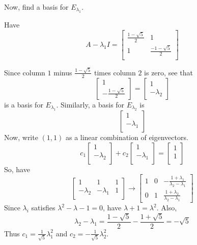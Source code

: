 \documentclass{article}
\begin{document}
\begin{example}
      Now, find a basis for $E_{\lambda_1}$.

      Have \[
        A - \lambda_1 I =
        \begin{bmatrix}
          \frac{1 - \sqrt{5}}{2} & 1\\
          1 & \frac{-1 - \sqrt{5}}{2}\\
        \end{bmatrix}
      \]

      Since column $1$ minus $\frac{1 - \sqrt{5}}{2}$ times column $2$ is zero, see that \[
        \begin{bmatrix}
          1\\
          -\frac{1 - \sqrt{5}}{2}
        \end{bmatrix} =
        \begin{bmatrix}
          1\\
          -\lambda_2
        \end{bmatrix}
      \] is a basis for $E_{\lambda_1}$. Similarly, a basis for $E_{\lambda_2}$ is \[
        \begin{bmatrix}
          1\\
          -\lambda_1\\
        \end{bmatrix}
      \]
      Now, write $(1, 1)$ as a linear combination of eigenvectors.
      \[
        c_1
        \begin{bmatrix}
          1\\-\lambda_2\\
        \end{bmatrix} + c_2
        \begin{bmatrix}
          1\\-\lambda_1\\
        \end{bmatrix} =
        \begin{bmatrix}
          1\\1\\
        \end{bmatrix}
      \] So, have \[
        \begin{bmatrix}
          1 & 1 & 1\\
          -\lambda_2 & -\lambda_1 & 1\\
        \end{bmatrix} \to
        \begin{bmatrix}
          1 & 0 & -\frac{1 + \lambda_1}{\lambda_2 - \lambda_1}\\
          0 & 1 & \frac{1 + \lambda_2}{\lambda_2 - \lambda_1}
        \end{bmatrix}
      \]
      Since $\lambda_i$ satisfies $\lambda^2 - \lambda - 1 = 0$, have $\lambda + 1 = \lambda^2$. Also, \[
        \lambda_2 - \lambda_1 = \frac{1 - \sqrt{5}}{2} - \frac{1 + \sqrt{5}}{2} = -\sqrt{5}
      \] Thus $c_1 = \frac{1}{\sqrt{5}}\lambda_1^2$ and $c_2 = -\frac{1}{\sqrt{5}}\lambda_2^2$.


\end{example}
\end{document}
